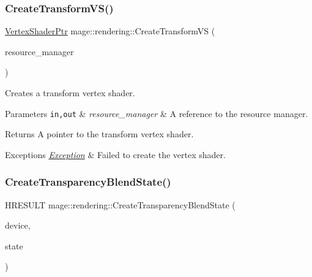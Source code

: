 \subsubsection{\texorpdfstring{Create\+Transform\+V\+S()}{CreateTransformVS()}}
{\footnotesize\ttfamily \mbox{\hyperlink{namespacemage_1_1rendering_aaf704b9c54a4181f4950a1761de69dda}{Vertex\+Shader\+Ptr}} mage\+::rendering\+::\+Create\+Transform\+VS (\begin{DoxyParamCaption}\item[{\mbox{\hyperlink{classmage_1_1rendering_1_1_resource_manager}{Resource\+Manager}} \&}]{resource\+\_\+manager }\end{DoxyParamCaption})}

Creates a transform vertex shader.


\begin{DoxyParams}[1]{Parameters}
\mbox{\tt in,out}  & {\em resource\+\_\+manager} & A reference to the resource manager. \\
\hline
\end{DoxyParams}
\begin{DoxyReturn}{Returns}
A pointer to the transform vertex shader. 
\end{DoxyReturn}

\begin{DoxyExceptions}{Exceptions}
{\em \mbox{\hyperlink{classmage_1_1_exception}{Exception}}} & Failed to create the vertex shader. \\
\hline
\end{DoxyExceptions}
\mbox{\label{namespacemage_1_1rendering_a97b9c14e5432d4a011a6531e4d1f212e}} 
\subsubsection{\texorpdfstring{Create\+Transparency\+Blend\+State()}{CreateTransparencyBlendState()}}
{\footnotesize\ttfamily H\+R\+E\+S\+U\+LT mage\+::rendering\+::\+Create\+Transparency\+Blend\+State (\begin{DoxyParamCaption}\item[{I\+D3\+D11\+Device \&}]{device,  }\item[{\mbox{\hyperlink{namespacemage_a8769f9d670d6b585ea306cb1062af94b}{Not\+Null}}$<$ I\+D3\+D11\+Blend\+State $\ast$$\ast$$>$}]{state }\end{DoxyParamCaption})\hspace{0.3cm}{\ttfamily [noexcept]}}

